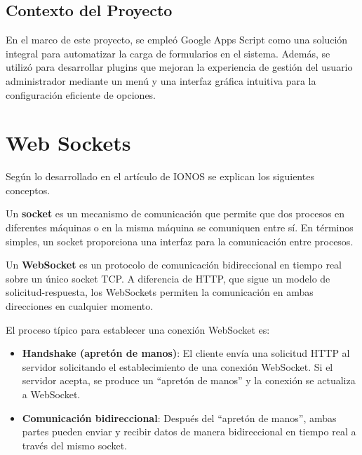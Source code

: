 \subsection{Contexto del Proyecto}

En el marco de este proyecto, se empleó Google Apps Script como una solución integral para automatizar la carga de formularios en el sistema. Además, se utilizó para desarrollar plugins que mejoran la experiencia de gestión del usuario administrador mediante un menú y una interfaz gráfica intuitiva para la configuración eficiente de opciones.



\section{Web Sockets}
Según lo desarrollado en el artículo de IONOS \cite{sockets} se explican los siguientes conceptos.

Un \textbf{socket} es un mecanismo de comunicación que permite que dos procesos en diferentes máquinas o en la misma máquina se comuniquen entre sí. En términos simples, un socket proporciona una interfaz para la comunicación entre procesos.

Un \textbf{WebSocket} es un protocolo de comunicación bidireccional en tiempo real sobre un único socket TCP. A diferencia de HTTP, que sigue un modelo de solicitud-respuesta, los WebSockets permiten la comunicación en ambas direcciones en cualquier momento.

El proceso típico para establecer una conexión WebSocket es:
\begin{itemize}
\item \textbf{Handshake (apretón de manos)}: El cliente envía una solicitud HTTP al servidor solicitando el establecimiento de una conexión WebSocket. Si el servidor acepta, se produce un “apretón de manos” y la conexión se actualiza a WebSocket.

\item \textbf{Comunicación bidireccional}: Después del “apretón de manos”, ambas partes pueden enviar y recibir datos de manera bidireccional en tiempo real a través del mismo socket.
\end{itemize}

